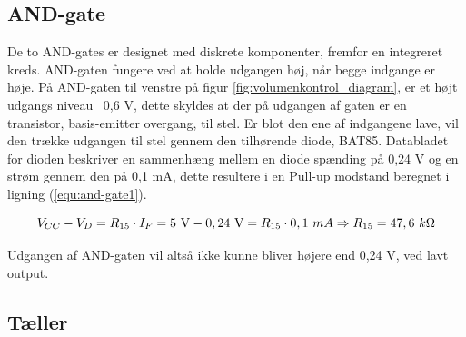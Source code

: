 \subsection*{AND-gate}
\label{volumenkontrol-design-and}

De to AND-gates er designet med diskrete komponenter, fremfor en integreret kreds. AND-gaten fungere ved at holde udgangen høj, når begge indgange er høje. På AND-gaten til venstre på figur \ref{fig:volumenkontrol_diagram}, er et højt udgangs niveau ~0,6 V, dette skyldes at der på udgangen af gaten er en transistor, basis-emitter overgang, til stel. Er blot den ene af indgangene lave, vil den trække udgangen til stel gennem den tilhørende diode, BAT85. Databladet for dioden beskriver en sammenhæng mellem en diode spænding på 0,24 V og en strøm gennem den på 0,1 mA, dette resultere i en Pull-up modstand beregnet i ligning (\ref{equ:and-gate1}).

\begin{equation}
\label{equ:and-gate1}
V_{CC} - V_D = R_{15} \cdot I_F = 5~\mathrm{V} - 0,24~\mathrm{V} = R_{15} \cdot 0,1~mA \Rightarrow R_{15} = 47,6~k\ohm
\end{equation}

Udgangen af AND-gaten vil altså ikke kunne bliver højere end 0,24 V, ved lavt output.

\subsection*{Tæller}
\label{volumenkontrol-design-taeller}


